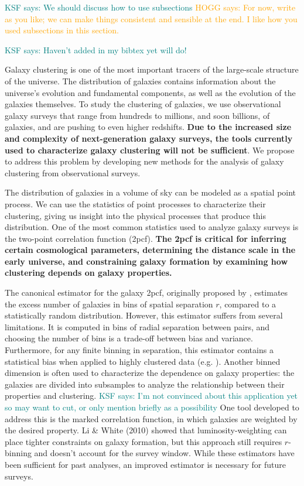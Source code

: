\documentclass[12pt, fullpage, letterpaper]{article}
\newcommand{\KSF}[1]{\textcolor{teal}{KSF says: #1}}
\newcommand{\HOGG}[1]{\textcolor{orange}{HOGG says: #1}}
\newcommand{\cf}{2pcf\xspace}
\begin{document}
\KSF{We should discuss how to use subsections} \HOGG{For now, write as you like; we can make things consistent and sensible at the end. I like how you used subsections in this section.}

\KSF{Haven't added in my bibtex yet will do!}

Galaxy clustering is one of the most important tracers of the large-scale structure of the universe.
The distribution of galaxies contains information about the universe's evolution and fundamental components, as well as the evolution of the galaxies themselves.
To study the clustering of galaxies, we use observational galaxy surveys that range from hundreds to millions, and soon billions, of galaxies, and are pushing to even higher redshifts.
\textbf{Due to the increased size and complexity of next-generation galaxy surveys, the tools currently used to characterize galaxy clustering will not be sufficient}.
We propose to address this problem by developing new methods for the analysis of galaxy clustering from observational surveys.

The distribution of galaxies in a volume of sky can be modeled as a spatial point process.
We can use the statistics of point processes to characterize their clustering, giving us insight into the physical processes that produce this distribution.
One of the most common statistics used to analyze galaxy surveys is the two-point correlation function (\cf). 
\textbf{The \cf is critical for inferring certain cosmological parameters, determining the distance scale in the early universe, and constraining galaxy formation by examining how clustering depends on galaxy properties.}
 
The canonical estimator for the galaxy \cf, originally proposed by \citep{LandySzalay1993}, estimates the excess number of galaxies in bins of spatial separation $r$, compared to a statistically random distribution.
However, this estimator suffers from several limitations. 
It is computed in bins of radial separation between pairs, and choosing the number of bins is a trade-off between bias and variance.
Furthermore, for any finite binning in separation, this estimator contains a statistical bias when applied to highly clustered data (e.g. \citealt{Kerscher1998}).
Another binned dimension is often used to characterize the dependence on galaxy properties: the galaxies are divided into subsamples to analyze the relationship between their properties and clustering. 
\KSF{I'm not convinced about this application yet so may want to cut, or only mention briefly as a possibility}
One tool developed to address this is the marked correlation function, in which galaxies are weighted by the desired property.
Li \& White (2010) showed that luminosity-weighting can place tighter constraints on galaxy formation, but this approach still requires $r$-binning and doesn't account for the survey window.
While these estimators have been sufficient for past analyses, an improved estimator is necessary for future surveys.
\end{document}
